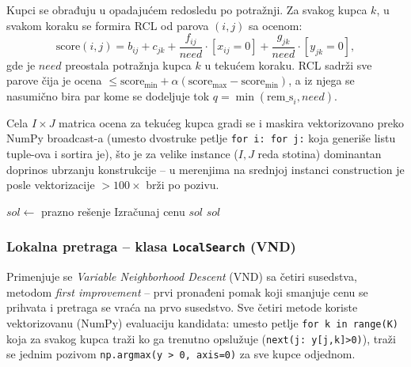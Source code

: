 \documentclass[12pt,a4paper]{article}
\begin{document}
Kupci se obrađuju u opadajućem redosledu po potražnji. Za svakog kupca $k$,
u svakom koraku se formira RCL od parova $(i,j)$ sa ocenom:
\[
  \text{score}(i,j) = b_{ij} + c_{jk}
    + \frac{f_{ij}}{need}\cdot[x_{ij}=0]
    + \frac{g_{jk}}{need}\cdot[y_{jk}=0],
\]
gde je $need$ preostala potražnja kupca $k$ u tekućem koraku.
RCL sadrži sve parove čija je ocena
$\leq \text{score}_{\min} + \alpha(\text{score}_{\max} - \text{score}_{\min})$,
a iz njega se nasumično bira par kome se dodeljuje tok
$q = \min(\text{rem\_s}_i, need)$.

Cela $I \times J$ matrica ocena za tekućeg kupca gradi se i maskira
vektorizovano preko NumPy broadcast-a (umesto dvostruke petlje
\texttt{for i: for j:} koja generiše listu tuple-ova i sortira je), što je
za velike instance ($I,J$ reda stotina) dominantan doprinos ubrzanju
konstrukcije -- u merenjima na srednjoj instanci construction je posle
vektorizacije $>100\times$ brži po pozivu.

\begin{algorithm}[H]
\caption{GreedyRandomizedConstruction$(D, \alpha)$}
\SetAlgoLined
$sol \leftarrow$ prazno rešenje\;
Izračunaj cenu $sol$\;
\Return $sol$
\end{algorithm}

\subsubsection{Lokalna pretraga -- klasa \texttt{LocalSearch} (VND)}

Primenjuje se \textit{Variable Neighborhood Descent} (VND) sa četiri
susedstva, metodom \textit{first improvement} -- prvi pronađeni pomak koji
smanjuje cenu se prihvata i pretraga se vraća na prvo susedstvo.
Sve četiri metode koriste vektorizovanu (NumPy) evaluaciju kandidata:
umesto petlje \texttt{for k in range(K)} koja za svakog kupca
traži ko ga trenutno opslužuje (\texttt{next(j: y[j,k]>0)}), traži se
jednim pozivom \texttt{np.argmax(y > 0, axis=0)} za sve kupce odjednom.
\end{document}
